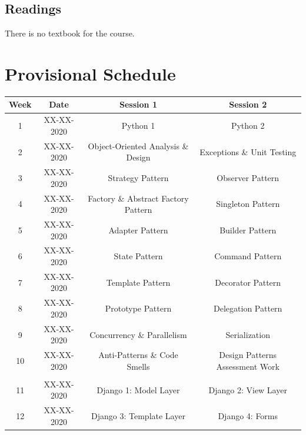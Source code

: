 \documentclass{article}
\begin{document}
\subsection*{Readings}
There is no textbook for the course.

\section*{Provisional Schedule}

\renewcommand{\arraystretch}{1.5}
\begin{tabular}{|c|c|c|c|}
	\hline
	\textbf{Week} & \textbf{Date} & \textbf{Session 1}                  & \textbf{Session 2}              \\ \hline
	1             & XX-XX-2020    & Python 1                            & Python 2                        \\ \hline					
	2             & XX-XX-2020    & Object-Oriented Analysis \& Design  & Exceptions \& Unit Testing      \\ \hline
	3             & XX-XX-2020    & Strategy Pattern                    & Observer Pattern                \\ \hline
	4             & XX-XX-2020    & Factory \& Abstract Factory Pattern & Singleton Pattern               \\ \hline
	5             & XX-XX-2020    & Adapter Pattern                     & Builder Pattern                 \\ \hline
	6             & XX-XX-2020    & State Pattern                       & Command Pattern                 \\ \hline
	7             & XX-XX-2020    & Template Pattern                    & Decorator Pattern               \\ \hline
	8             & XX-XX-2020    & Prototype Pattern                   & Delegation Pattern              \\ \hline
	9             & XX-XX-2020    & Concurrency \& Parallelism          & Serialization                   \\ \hline
	10            & XX-XX-2020    & Anti-Patterns \& Code Smells        & Design Patterns Assessment Work \\ \hline
	\rowcolor{yellow} \multicolumn{4}{|c|}{Mid Term Break}                                                \\ \hline
	11            & XX-XX-2020    & Django 1: Model Layer               & Django 2: View Layer            \\ \hline
	12            & XX-XX-2020    & Django 3: Template Layer            & Django 4: Forms                 \\ \hline

\end{tabular}
\end{document}
